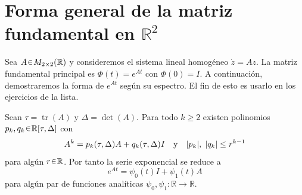 \section*{Forma general de la matriz fundamental en $\mathbb{R}^2$}
Sea $A \en M_{2\times 2}(\mathbb{R})$ y consideremos el sistema lineal homogéneo
\(
\dot{z} = Az.
\)
La matriz fundamental principal es $\Phi(t) = e^{At}$ con $\Phi(0) = I$. 
A continuación, demostraremos la forma de $e^{At}$ según su espectro. El fin de esto es usarlo en los ejercicios de la lista.\par

\begin{lema}\label{lema:CH}
Sean $\tau = \operatorname{tr}(A)$ y $\Delta = \det(A)$. Para todo $k \geq 2$ existen polinomios $p_k, q_k \en \mathbb{R}[\tau, \Delta]$ con
\[
A^k = p_k(\tau, \Delta) A + q_k(\tau, \Delta) I%
\quad\text{y}\quad
\abs{p_k},\;\abs{q_k} \leq r^{k-1}
\]
para algún $r \en \mathbb{R}$.
Por tanto la serie exponencial se reduce a
\[
e^{At} = \psi_0(t) I + \psi_1(t) A
\]
para algún par de funciones analíticas $\psi_0, \psi_1: \mathbb{R} \to \mathbb{R}$.
\end{lema}

